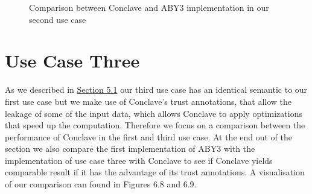 \begin{figure}[H]
	\caption{Comparison between Conclave and ABY3 implementation in our second use case}
\end{figure}



\section{Use Case Three}
As we described in  \hyperref[Implementation]{Section 5.1} our third use case has an identical semantic to our first use case but we make use of Conclave's trust annotations, that allow the leakage of some of the input data, which allows Conclave to apply optimizations that speed up the computation. Therefore we focus on a comparison between the performance of Conclave in the first and third use case. At the end out of the section we also compare the first implementation of ABY3 with the implementation of use case three with Conclave to see if Conclave yields comparable result if it has the advantage of its trust annotations.
 A visualisation of our comparison can found in Figures 6.8 and 6.9. 
